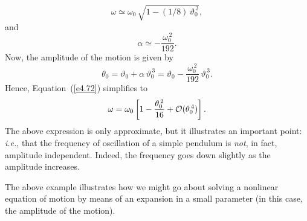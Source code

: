 \begin{equation}\label{e4.72}
\omega \simeq \omega_0 \,\sqrt{1-(1/8)\,\vartheta_0^{\,2}},
\end{equation}
and
\begin{equation}
\alpha\simeq -\frac{\omega_0^{\,2}}{192}.
\end{equation}
Now, the amplitude of the motion is given by
\begin{equation}
\theta_0 = \vartheta_0 + \alpha\,\vartheta_0^{\,3} = \vartheta_0-\frac{\omega_0^{\,2}}{192}\,\vartheta_0^{\,3}.
\end{equation}
Hence, Equation~(\ref{e4.72}) simplifies to
\begin{equation}
\omega = \omega_0\left[1-\frac{\theta_0^{\,2}}{16} + {\cal O}(\theta_0^{\,4})\right].
\end{equation}
The above expression is only approximate, but it illustrates an important
point: {\em i.e.}, that the frequency of oscillation of a simple pendulum
is {\em not}, in fact, amplitude independent. Indeed, the frequency
goes down slightly as the amplitude increases.

The above example illustrates how we might go about solving a
nonlinear equation of motion by means of an expansion in a
small parameter (in this case, the amplitude of the motion).


